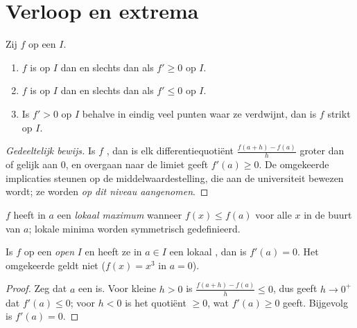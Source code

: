 \section{Verloop en extrema}

\begin{theorem}\label{thm:g12:deriv:variations}
Zij $f$  op een  $I$.
\begin{enumerate}
  \item $f$ is  op $I$ dan en slechts dan als $f' \geq 0$ op $I$.
  \item $f$ is  op $I$ dan en slechts dan als $f' \leq 0$ op $I$.
  \item Is $f' > 0$ op $I$ behalve in eindig veel punten waar ze verdwijnt,
        dan is $f$ strikt  op $I$.
\end{enumerate}
\end{theorem}

\begin{proof}[Gedeeltelijk bewijs]
Is $f$ , dan is elk differentiequotiënt
$\frac{f(a+h)-f(a)}{h}$ groter dan of gelijk aan $0$, en overgaan naar de
limiet geeft $f'(a) \geq 0$. De omgekeerde implicaties steunen op de
middelwaardestelling, die aan de universiteit bewezen wordt; ze worden
\emph{op dit niveau aangenomen}.
\end{proof}

\begin{definition}\label{def:g12:deriv:extremum}
$f$ heeft in $a$ een \emph{lokaal maximum} wanneer
$f(x) \leq f(a)$ voor alle $x$ in de buurt van $a$; lokale minima worden
symmetrisch gedefinieerd.
\end{definition}

\begin{proposition}\label{prop:g12:deriv:critical}
Is $f$  op een \emph{open}  $I$ en heeft ze in
$a \in I$ een lokaal , dan is $f'(a) = 0$. Het omgekeerde geldt niet
($f(x) = x^3$ in $a = 0$).
\end{proposition}

\begin{proof}
Zeg dat $a$ een  is. Voor kleine $h > 0$ is
$\frac{f(a+h)-f(a)}{h} \leq 0$, dus geeft $h \to 0^+$ dat $f'(a) \leq 0$;
voor $h < 0$ is het quotiënt $\geq 0$, wat $f'(a) \geq 0$ geeft. Bijgevolg is
$f'(a) = 0$.
\end{proof}

